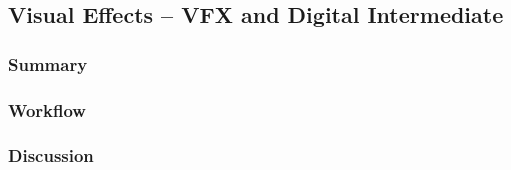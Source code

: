 \subsection{Visual Effects -- VFX and Digital Intermediate} \label{subsec:tv-vfx}

	\subsubsection{Summary}
	
	\lipsum[1] %
	
	\subsubsection{Workflow}
	
	\lipsum[1] %
	
	\subsubsection{Discussion}
	
	\lipsum[1] %